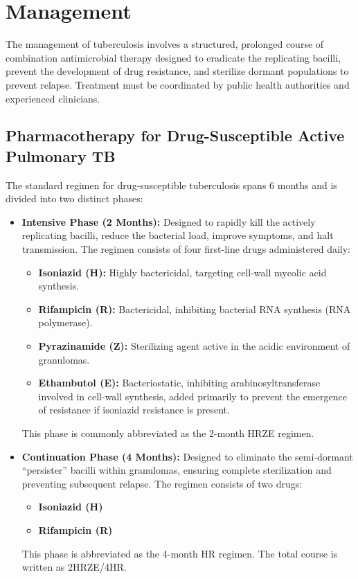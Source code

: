 \section*{Management}
The management of tuberculosis involves a structured, prolonged course of combination antimicrobial therapy designed to eradicate the replicating bacilli, prevent the development of drug resistance, and sterilize dormant populations to prevent relapse. Treatment must be coordinated by public health authorities and experienced clinicians.

\subsection*{Pharmacotherapy for Drug-Susceptible Active Pulmonary TB}
The standard regimen for drug-susceptible tuberculosis spans 6 months and is divided into two distinct phases:
\begin{itemize}
    \item \textbf{Intensive Phase (2 Months):} Designed to rapidly kill the actively replicating bacilli, reduce the bacterial load, improve symptoms, and halt transmission. The regimen consists of four first-line drugs administered daily:
    \begin{itemize}
        \item \textbf{Isoniazid (H):} Highly bactericidal, targeting cell-wall mycolic acid synthesis.
        \item \textbf{Rifampicin (R):} Bactericidal, inhibiting bacterial RNA synthesis (RNA polymerase).
        \item \textbf{Pyrazinamide (Z):} Sterilizing agent active in the acidic environment of granulomas.
        \item \textbf{Ethambutol (E):} Bacteriostatic, inhibiting arabinosyltransferase involved in cell-wall synthesis, added primarily to prevent the emergence of resistance if isoniazid resistance is present.
    \end{itemize}
    This phase is commonly abbreviated as the 2-month HRZE regimen.
    \item \textbf{Continuation Phase (4 Months):} Designed to eliminate the semi-dormant ``persister'' bacilli within granulomas, ensuring complete sterilization and preventing subsequent relapse. The regimen consists of two drugs:
    \begin{itemize}
        \item \textbf{Isoniazid (H)}
        \item \textbf{Rifampicin (R)}
    \end{itemize}
    This phase is abbreviated as the 4-month HR regimen. The total course is written as 2HRZE/4HR.
\end{itemize}

